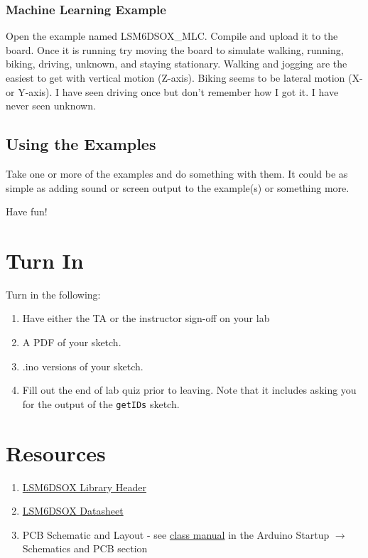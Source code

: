 \subsubsection{Machine Learning Example}
Open the example named LSM6DSOX\_MLC. Compile and upload it to the board. Once it is 
running try moving the board to simulate walking, running, biking, driving, unknown, and 
staying stationary. Walking and jogging are the easiest to get with vertical motion (Z-axis). 
Biking seems to be lateral motion (X- or Y-axis). I have seen driving once but don't remember 
how I got it. I have never seen unknown.

\subsection{Using the Examples}
Take one or more of the examples and do something with them. It could be as simple as 
adding sound or screen output to the example(s) or something more.

\medskip

\noindent Have fun!

\section{Turn In}
Turn in the following:
\begin{enumerate}
    \item Have either the TA or the instructor sign-off on your lab
    \item A PDF of your sketch.
    \item .ino versions of your sketch.
    \item Fill out the end of lab quiz prior to leaving. Note that it includes asking you 
            for the output of the \lstinline$getIDs$ sketch. 
\end{enumerate}

\section{Resources}%
\begin{enumerate}
    \item \href{https://github.com/stm32duino/LSM6DSOX/blob/main/src/LSM6DSOXSensor.h}{LSM6DSOX Library Header}
    \item \href{https://www.st.com/resource/en/datasheet/lsm6dsox.pdf}{LSM6DSOX Datasheet}
    \item PCB Schematic and Layout - see 
            \href{https://github.com/semcneil/Fundamentals-of-Microcontrollers-Manual}{class manual} 
            in the Arduino Startup $\rightarrow$ Schematics and PCB section
\end{enumerate}

